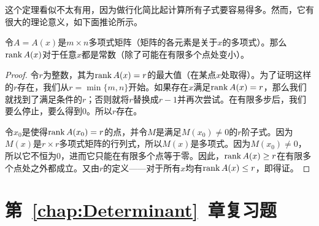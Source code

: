 这个定理看似不太有用，因为做行化简比起计算所有子式要容易得多。然而，它有很大的理论意义，如下面推论所示。

\begin{corollary}
  令$A=A(x)$是$m\times n$多项式矩阵（矩阵的各元素是关于$x$的多项式）。那么$\operatorname{rank} A(x)$对于任意$x$都是常数（除了可能在有限多个点处变小）。
\end{corollary}
\begin{proof}
  令$r$为整数，其为$\operatorname{rank} A(x)=r$的最大值（在某点$x$处取得）。为了证明这样的$r$存在，我们从$r=\min\{m,n\}$开始。如果存在$x$满足$\operatorname{rank} A(x)=r$，那么我们就找到了满足条件的$r$；否则就将$r$替换成$r-1$并再次尝试。在有限多步后，我们要么停止，要么得到$0$。所以$r$存在。

  令$x_0$是使得$\operatorname{rank} A(x_0)=r$的点，并令$M$是满足$M(x_0)\ne 0$的$r$阶子式。因为$M(x)$是$r\times r$多项式矩阵的行列式，所以$M(x)$是多项式。因为$M(x_0)\ne 0$，所以它不恒为$0$，进而它只能在有限多个点等于零。因此，$\operatorname{rank} A(x)\ge r$在有限多个点处之外都成立。又由$r$的定义——对于所有$x$均有$\operatorname{rank} A(x)\le r$，即得证。
\end{proof}

\section{第~\textup{\ref{chap:Determinant}}~章复习题}

